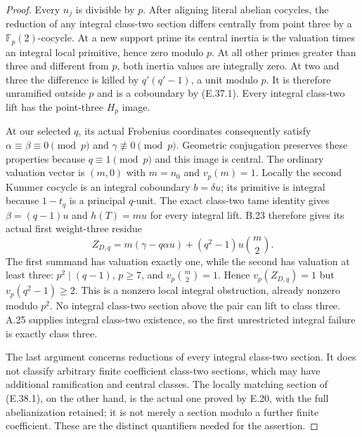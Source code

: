 \begin{proof}
Every $n_j$ is divisible by $p$.  After aligning literal abelian
cocycles, the reduction of any integral class-two section differs
centrally from point three by a $\mathbb F_p(2)$-cocycle.
At a new support prime its central inertia is the valuation times
an integral local primitive, hence zero modulo $p$.  At all other
primes greater than three and different from $p$, both inertia
values are integrally zero.  At two and three the difference is
killed by $q'(q'-1)$, a unit modulo $p$.  It is therefore
unramified outside $p$ and is a coboundary by (E.37.1).
Every integral class-two lift has the point-three $H_p$ image.

At our selected $q$, its actual Frobenius coordinates consequently
satisfy
$\alpha\equiv\beta\equiv0\pmod p$ and
$\gamma\not\equiv0\pmod p$.  Geometric conjugation preserves these
properties because $q\equiv1\pmod p$ and this image is central.
The ordinary valuation vector is $(m,0)$ with $m=n_0$ and
$v_p(m)=1$.  Locally the second Kummer cocycle is an integral
coboundary $b=\delta u$; its primitive is integral because
$1-t_q$ is a principal $q$-unit.  The exact class-two tame
identity gives $\beta=(q-1)u$ and $h(T)=mu$ for every integral
lift.  B.23 therefore gives its actual first weight-three residue
\[
 Z_{D,q}=m(\gamma-q\alpha u)
                  +(q^2-1)u\binom m2.
 \tag{E.38.8}
\]
The first summand has valuation exactly one, while the second has
valuation at least three: $p^2\mid(q-1)$, $p\ge7$, and
$v_p\binom m2=1$.  Hence $v_p(Z_{D,q})=1$ but
$v_p(q^2-1)\ge2$.  This is a nonzero local integral obstruction,
already nonzero modulo $p^2$.  No integral class-two section
above the pair can lift to class three.  A.25 supplies integral
class-two existence, so the first unrestricted integral failure
is exactly class three.

The last argument concerns reductions of every integral
class-two section.  It does not classify arbitrary finite
coefficient class-two sections, which may have additional
ramification and central classes.  The locally matching section
of (E.38.1), on the other hand, is the actual one proved by
E.20, with the full abelianization retained; it is not merely a
section modulo a further finite coefficient.  These are the
distinct quantifiers needed for the assertion.
\end{proof}
